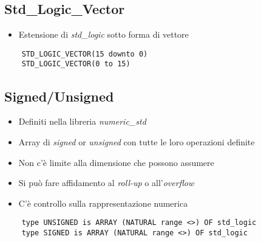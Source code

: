 \documentclass{article}
\begin{document}
\subsection{Std\_Logic\_Vector}
\begin{itemize}
  \item Estensione di \textit{std\_logic} sotto forma di vettore
\end{itemize}
\begin{verbatim}
    STD_LOGIC_VECTOR(15 downto 0)
    STD_LOGIC_VECTOR(0 to 15)
\end{verbatim}

\subsection{Signed/Unsigned}
\begin{itemize} \item Definiti nella libreria \textit{numeric\_std}
  \item Array di \textit{signed} or \textit{unsigned} con tutte le loro operazioni definite
  \item Non c'è limite alla dimensione che possono assumere
  \item Si può fare affidamento al \textit{roll-up} o all'\textit{overflow}
  \item C'è controllo sulla rappresentazione numerica
\end{itemize}
\begin{verbatim}
    type UNSIGNED is ARRAY (NATURAL range <>) OF std_logic
    type SIGNED is ARRAY (NATURAL range <>) OF std_logic
\end{verbatim}

\newpage
\end{document}
